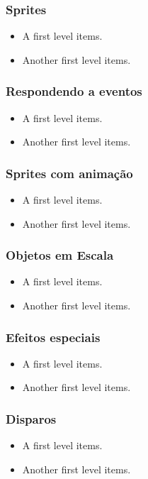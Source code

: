 
\begin{frame}
    \frametitle{Sprites}

    \begin{itemize}
        \item A first level items.
        \item Another first level items.
    \end{itemize}
\end{frame}

\begin{frame}
    \frametitle{Respondendo a eventos}

    \begin{itemize}
        \item A first level items.
        \item Another first level items.
    \end{itemize}
\end{frame}

\begin{frame}
    \frametitle{Sprites com animação}

    \begin{itemize}
        \item A first level items.
        \item Another first level items.
    \end{itemize}
\end{frame}

\begin{frame}
    \frametitle{Objetos em Escala}

    \begin{itemize}
        \item A first level items.
        \item Another first level items.
    \end{itemize}
\end{frame}

\begin{frame}
    \frametitle{Efeitos especiais}

    \begin{itemize}
        \item A first level items.
        \item Another first level items.
    \end{itemize}
\end{frame}

\begin{frame}
    \frametitle{Disparos}

    \begin{itemize}
        \item A first level items.
        \item Another first level items.
    \end{itemize}
\end{frame}

